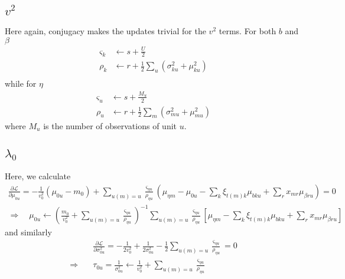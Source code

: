 \documentclass[11pt]{article}
\begin{document}
\subsection{$v^2$}
Here again, conjugacy makes the updates trivial for the $v^2$ terms. For both $b$ and $\beta$
\begin{align}
    \varsigma_k &\leftarrow s + \frac{U}{2} \\
    \rho_k &\leftarrow r + \frac{1}{2}\sum_u (\sigma^2_{ku} + \mu^2_{ku}) \\
\end{align}
while for $\eta$
\begin{align}
    \varsigma_u &\leftarrow s + \frac{M_u}{2} \\
    \rho_u &\leftarrow r + \frac{1}{2} \sum_m (\sigma^2_{mu} + \mu^2_{mu})
\end{align}
where $M_u$ is the number of observations of unit $u$.

\subsection{$\lambda_0$}
Here, we calculate
\begin{multline}
    \frac{\partial\mathcal{L}}{\partial \mu_{0u}} = -\frac{1}{v_0^2} (\mu_{0u} - m_0) + \sum_{u(m) = u} \frac{\varsigma_{\eta u}}{\rho_{\eta u}} 
    \left( 
    \mu_{\eta m} - \mu_{0u} - \sum_k \xi_{t(m) k} \mu_{bku} + 
    \sum_r x_{mr} \mu_{\beta ru}
    \right) = 0 \\
    \Rightarrow \quad \mu_{0u} \leftarrow 
    \left(\frac{m_0}{v_0^2} + \sum_{u(m) = u} \frac{\varsigma_{\eta u}}{\rho_{\eta u}}  \right)^{-1} 
    \sum_{u(m) = u} \frac{\varsigma_{\eta u}}{\rho_{\eta u}} 
    \left[
    \mu_{\eta m} - \sum_k \xi_{t(m) k} \mu_{bku} + 
    \sum_r x_{mr} \mu_{\beta ru}
    \right]
\end{multline}
and similarly
\begin{align}
    &\frac{\partial\mathcal{L}}{\partial \sigma^2_{0u}} = -\frac{1}{2v_0^2} + 
    \frac{1}{2\sigma^2_{0u}} - \frac{1}{2} \sum_{u(m) = u} \frac{\varsigma_{\eta u}}{\rho_{\eta u}} = 0 \\
    \Rightarrow \quad &\tau_{0u} = \frac{1}{\sigma^2_{0u}} \leftarrow 
    \frac{1}{v^2_0} + \sum_{u(m) = u} \frac{\varsigma_{\eta u}}{\rho_{\eta u}}
\end{align}
\end{document}
